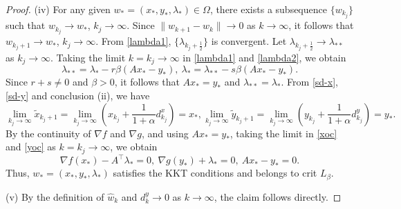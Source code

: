 \documentclass[pdflatex,sn-mathphys-num]{sn-jnl}%
\theoremstyle{thmstyleone}%
\theoremstyle{thmstyletwo}%
\theoremstyle{thmstylethree}%
\begin{document}
\begin{proof}
(iv) For any given $w_*=(x_*,y_*,\lambda_*)\in\Omega$, there exists a subsequence $\{w_{k_j}\}$ such that $w_{k_j} \to w_*$, $k_j \to \infty$. Since $\|w_{k+1}-w_k\|\to 0$ as $k\to\infty$, it follows that $w_{k_j+1} \to w_*$, $k_j \to \infty$. From \eqref{lambda1}, $\{\lambda_{{k_j}+\frac{1}{2}}\}$ is convergent.
Let $\lambda_{{k_j}+\frac{1}{2}} \to \lambda_{**}$ as $k_j\to \infty$. Taking the limit $k={k_j}\to \infty$ in \eqref{lambda1} and \eqref{lambda2}, we obtain
\[\lambda_{**}=\lambda_{*}-r\beta(Ax_*-y_*),~\lambda_{*}=\lambda_{**}-s\beta(Ax_*-y_*).\]
Since $r+s\not=0$ and $\beta>0$, it follows that $Ax_*=y_*$ and $\lambda_{**}=\lambda_{*}$.
From \eqref{sd-x}, \eqref{sd-y} and conclusion (ii), we have
\[\lim\limits_{k_j\to \infty}\tilde{x}_{{k_j}+1}=\lim\limits_{k_j\to \infty}(x_{k_j}+\frac{1}{1+\alpha}d_{k_j}^x)=x_*,
\lim\limits_{k_j\to \infty}\tilde{y}_{{k_j}+1}=\lim\limits_{k_j\to \infty}(y_{k_j}+\frac{1}{1+\alpha}d_{k_j}^y)=y_*.\]
By the continuity of $\nabla f$ and $\nabla g$, and using $Ax_*=y_*$, taking the limit in \eqref{xoc} and \eqref{yoc} as $k=k_j\to \infty$, we obtain
\[
\nabla f(x_*)-A^{\top}\lambda_*=0,~\nabla g(y_*)+\lambda_*=0,~Ax_*-y_*=0.
\]
Thus, $w_*=(x_*,y_*,\lambda_*)$ satisfies the KKT conditions and belongs to crit $L_\beta$.

(v) By the definition of $\hat{w}_k$ and $d_k^y \to 0$ as $k \to \infty$, the claim follows directly.
\end{proof}
\end{document}
